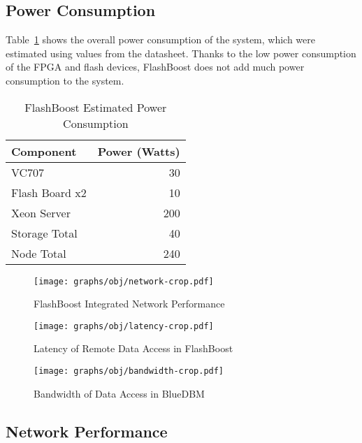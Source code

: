 \subsection{Power Consumption}
Table~\ref{tab:power} shows the overall power consumption of the system, which
were estimated using values from the datasheet. Thanks to the low power
consumption of the FPGA and flash devices, FlashBoost does not add much power
consumption to the system.

\begin{table}[h]\footnotesize
\centering
\begin{tabular}{l | r}
Component & Power (Watts) \\
\hline \hline
VC707 & 30 \\
Flash Board x2 & 10 \\
Xeon Server & 200 \\
\hline
Storage Total & 40 \\
Node Total & 240 \\

\end{tabular}
\caption{FlashBoost Estimated Power Consumption}
\label{tab:power}
\end{table}

\begin{figure*}[ht]
\centering
\vspace{0pt}
\begin{minipage}[c]{.3\textwidth}
	\texttt{[image: graphs/obj/network-crop.pdf]}
	\caption{FlashBoost Integrated Network Performance}
	\label{fig:result_network}
\end{minipage}\hfill
\vspace{0pt}
\begin{minipage}[c]{.3\textwidth}
	\texttt{[image: graphs/obj/latency-crop.pdf]}
	\caption{Latency of Remote Data Access in FlashBoost}
	\label{fig:result_latency}
\end{minipage}\hfill
\vspace{0pt}
\begin{minipage}[c]{.3\textwidth}
	\texttt{[image: graphs/obj/bandwidth-crop.pdf]}
	\caption{Bandwidth of Data Access in BlueDBM}
	\label{fig:result_bandwidth}
\end{minipage}
\end{figure*}

\subsection{Network Performance}

